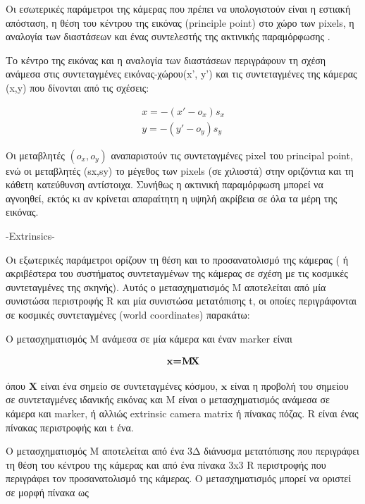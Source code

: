 Οι εσωτερικές παράμετροι της κάμερας που πρέπει να υπολογιστούν είναι η εστιακή απόσταση, η θέση του κέντρου της εικόνας (principle point) στο χώρο των pixels, η αναλογία των διαστάσεων και ένας συντελεστής της ακτινικής παραμόρφωσης \cite{Malik2002}. 



Το κέντρο της εικόνας και η αναλογία των διαστάσεων περιγράφουν τη σχέση ανάμεσα στις συντεταγμένες εικόνας-χώρου(x', y') και τις συντεταγμένες της κάμερας (x,y) που δίνονται από τις σχέσεις:

\begin{equation}
\begin{aligned}
x=-(x'-o_{x})s_{x}
\\
y=-(y'-o_{y})s_{y}
\end{aligned}
\end{equation}

Οι μεταβλητές $(o_{x},o_{y})$ αναπαριστούν τις συντεταγμένες pixel του principal point, ενώ οι μεταβλητές (sx,sy) το μέγεθος των pixels (σε χιλιοστά) στην οριζόντια και τη κάθετη κατεύθυνση αντίστοιχα.
Συνήθως η ακτινική παραμόρφωση μπορεί να αγνοηθεί, εκτός κι αν κρίνεται απαραίτητη η υψηλή ακρίβεια σε όλα τα μέρη της εικόνας. 


-Extrinsics-

Οι εξωτερικές παράμετροι ορίζουν τη θέση και το προσανατολισμό της κάμερας ( ή ακριβέστερα του συστήματος συντεταγμένων της κάμερας σε σχέση με τις κοσμικές συντεταγμένες της σκηνής). Αυτός ο μετασχηματισμός M αποτελείται από μία συνιστώσα περιστροφής R και μία συνιστώσα μετατόπισης t, οι οποίες περιγράφονται σε κοσμικές συντεταγμένες (world coordinates) παρακάτω:



Ο μετασχηματισμός M ανάμεσα σε μία κάμερα και έναν marker είναι

\begin{equation}
\textbf{x=M\!X}
\end{equation}


όπου $\textbf{Χ}$ είναι ένα σημείο σε συντεταγμένες κόσμου, $\textbf{x}$ είναι η προβολή του σημείου σε συντεταγμένες ιδανικής εικόνας και M είναι ο μετασχηματισμός ανάμεσα σε κάμερα και marker, ή αλλιώς extrinsic camera matrix ή πίνακας πόζας. R είναι ένας πίνακας περιστροφής  και t ένα.

Ο μετασχηματισμός M αποτελείται από ένα  3Δ διάνυσμα μετατόπισης που περιγράφει τη θέση του κέντρου της κάμερας και από ένα πίνακα 3x3 R περιστροφής που περιγράφει τον προσανατολισμό της κάμερας. Ο μετασχηματισμός μπορεί να οριστεί σε μορφή πίνακα ως 


